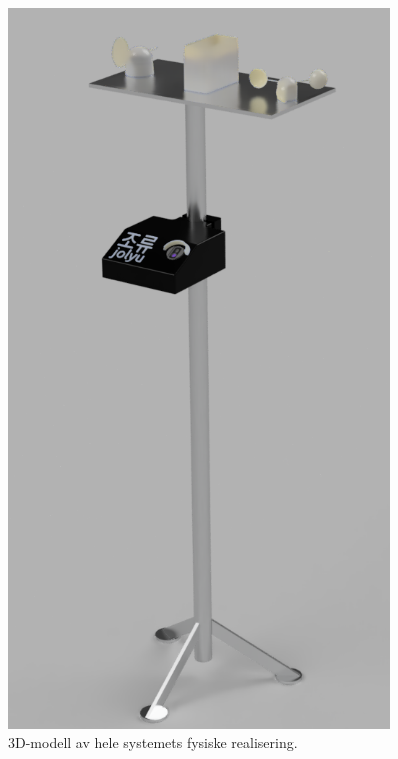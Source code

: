 \begin{figure}[!htbp]
\begin{minipage}[c]{0.45\textwidth}
\end{minipage}
\begin{minipage}[c]{0.45\textwidth}
\centering
    \includegraphics[width=0.9\textwidth]{implementering/stativ_render.png}
    \caption{3D-modell av hele systemets fysiske realisering.}
    \label{fig:3dsystem}
\end{minipage}
\end{figure}